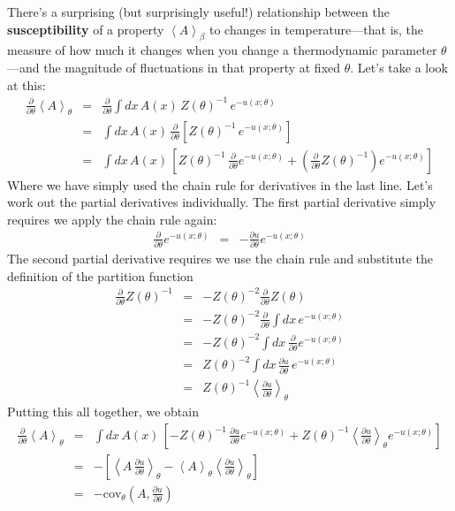 \documentclass[english,course]{lecture}
\begin{document}
There's a surprising (but surprisingly useful!) relationship between the {\bf susceptibility} of a property $\left< A \right>_\beta$ to changes in temperature---that is, the measure of how much it changes when you change a thermodynamic parameter $\theta$---and the magnitude of fluctuations in that property at fixed $\theta$.
Let's take a look at this:
\begin{eqnarray}
\frac{\partial}{\partial\theta} \left< A \right>_\theta 
&=& \frac{\partial}{\partial \theta} \int dx \, A(x) \, Z(\theta)^{-1} \, e^{-u(x; \theta)} \\
&=& \int dx \, A(x) \, \frac{\partial}{\partial\theta} \left[ Z(\theta)^{-1} \, e^{-u(x; \theta)} \right] \\
&=& \int dx \, A(x) \, \left[ Z(\theta)^{-1} \,\frac{\partial}{\partial\theta} e^{-u(x; \theta)} + \left( \frac{\partial}{\partial\theta} Z(\theta)^{-1} \right) e^{-u(x; \theta)} \right]
\end{eqnarray}
Where we have simply used the chain rule for derivatives in the last line.
Let's work out the partial derivatives individually.
The first partial derivative simply requires we apply the chain rule again:
\begin{eqnarray}
\frac{\partial}{\partial\theta} e^{-u(x; \theta)} &=& - \frac{\partial u}{\partial\theta} e^{-u(x; \theta)} 
\end{eqnarray}
The second partial derivative requires we use the chain rule and substitute the definition of the partition function
\begin{eqnarray}
\frac{\partial}{\partial\theta} Z(\theta)^{-1} &=& - Z(\theta)^{-2} \frac{\partial}{\partial\theta} Z(\theta) \\
&=& - Z(\theta)^{-2} \frac{\partial}{\partial\theta} \int dx \, e^{-u(x; \theta)} \\
&=& - Z(\theta)^{-2} \int dx \, \frac{\partial}{\partial\theta} e^{-u(x; \theta)} \\
&=& Z(\theta)^{-2} \int dx \, \frac{\partial u}{\partial\theta} \, e^{-u(x; \theta)} \\
&=& Z(\theta)^{-1} \left< \frac{\partial u}{\partial\theta} \right>_\theta
\end{eqnarray}
Putting this all together, we obtain
\begin{eqnarray}
\frac{\partial}{\partial\theta} \left< A \right>_\theta &=& \int dx \, A(x) \, \left[ - Z(\theta)^{-1} \, \frac{\partial u}{\partial\theta} e^{-u(x; \theta)} + Z(\theta)^{-1} \left< \frac{\partial u}{\partial\theta} \right>_\theta e^{-u(x; \theta)} \right] \\
&=& - \left[ \left< A \, \frac{\partial u}{\partial\theta} \right>_\theta - \left< A \right>_\theta \left< \frac{\partial u}{\partial\theta} \right>_\theta \right] \\
&=& - \mathrm{cov}_{\theta} \left( A, \frac{\partial u}{\partial\theta} \right)
\end{eqnarray}
\end{document}
